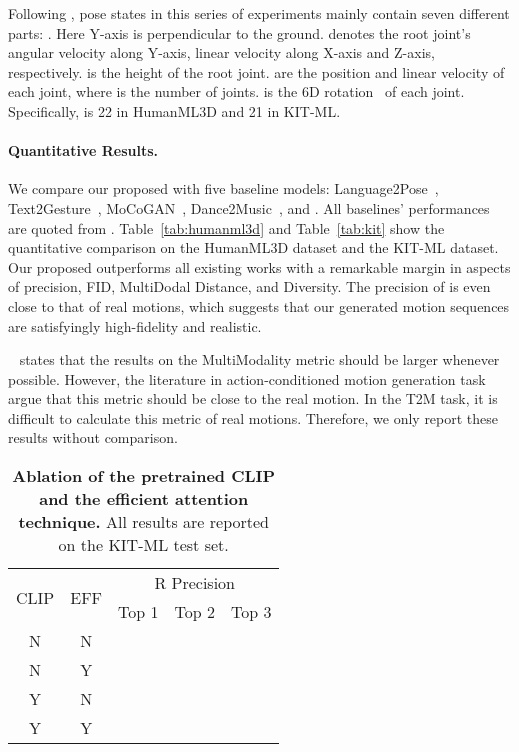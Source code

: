 Following \cite{guo2022generating}, pose states in this series of experiments mainly contain seven different parts: . Here Y-axis is perpendicular to the ground.  denotes the root joint's angular velocity along Y-axis, linear velocity along X-axis and Z-axis, respectively.  is the height of the root joint.  are the position and linear velocity of each joint, where  is the number of joints.  is the 6D rotation~\citep{zhou2019continuity} of each joint. Specifically,  is 22 in HumanML3D and 21 in KIT-ML.




\paragraph{Quantitative Results.}\label{sec4_1_4}

We compare our proposed \name with five baseline models:  Language2Pose~\citep{ahuja2019language2pose}, Text2Gesture~\citep{bhattacharya2021text2gestures}, MoCoGAN~\citep{tulyakov2018mocogan}, Dance2Music~\citep{lee2019dancing}, and \cite{guo2022generating}. All baselines' performances are quoted from \cite{guo2022generating}. Table~\ref{tab:humanml3d} and Table~\ref{tab:kit} show the quantitative comparison on the HumanML3D dataset and the KIT-ML dataset. Our proposed \name outperforms all existing works with a remarkable margin in aspects of precision, FID, MultiDodal Distance, and Diversity. The precision of \name is even close to that of real motions, which suggests that our generated motion sequences are satisfyingly high-fidelity and realistic. 

~\cite{guo2022generating} states that the results on the MultiModality metric should be larger whenever possible. However, the literature in action-conditioned motion generation task~\citep{guo2020action2motion,petrovich2021action,cervantes2022implicit} argue that this metric should be close to the real motion. In the T2M task, it is difficult to calculate this metric of real motions. Therefore, we only report these results without comparison.






\begin{table}[ht]
\centering
\caption{\textbf{Ablation of the pretrained CLIP and the efficient attention technique.} All results are reported on the KIT-ML test set.}
\label{tab:kit_ablation}
\setlength{\tabcolsep}{1.4mm}
{
\begin{tabular}{ccccc}
\hline

\multirow{2}{1cm}{CLIP} & \multirow{2}{1cm}{\centering EFF} & \multicolumn{3}{c}{\centering R Precision}  \\
& & Top 1 & Top 2 & Top 3 \\
\hline
N & N &  &  &  \\
N & Y &  &  &  \\
Y & N &  &  &  \\
Y & Y &  &  &  \\
\hline
\end{tabular}}
\end{table}

